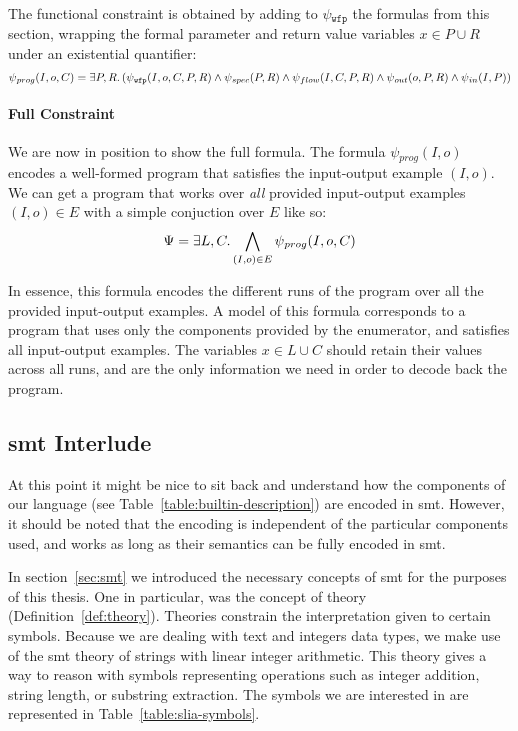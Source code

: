 The functional constraint is obtained by adding to $\psi{}_{\mathtt{wfp}}$ the
formulas from this section, wrapping the formal parameter and return value
variables $x \in P \cup R$ under an existential quantifier:
%
\[
  \psi{}_{prog}(I, o, C) = \exists P,R\ldotp
  (\psi{}_{\mathtt{wfp}}(I, o, C, P, R) \wedge
  \psi{}_{spec}(P, R) \wedge
  \psi{}_{flow}(I, C, P, R) \wedge 
  \psi{}_{out}(o, P, R) \wedge
  \psi{}_{in}(I, P))
\]

\paragraph{Full Constraint}
\label{sec:full-constraint}

We are now in position to show the full formula. The formula $\psi{}_{prog}(I,
o)$ encodes a well-formed program that satisfies the input-output example $(I,
o)$. We can get a program that works over \textit{all} provided
input-output examples $(I, o) \in E$ with a simple conjuction over $E$ like so:
%
\[
  \Psi{} = \exists L,C\ldotp \bigwedge_{(I, o) \in E}\psi{}_{prog}(I, o, C)
\]

\noindent
In essence, this formula encodes the different runs of the program over all
the provided input-output examples. A model of this formula corresponds to a
program that uses only the components provided by the enumerator, and satisfies
all input-output examples. The variables $x \in L \cup C$ should retain their
values across all runs, and are the only information we need in order to decode
back the program.

\subsection{\gls{smt} Interlude}
\label{sec:smt-interlude}

At this point it might be nice to sit back and understand how the components of
our language (see Table~\ref{table:builtin-description}) are encoded in
\gls{smt}.
However, it should be noted that the encoding is independent of the particular
components used, and works as long as their semantics can be fully encoded in
\gls{smt}.

In section~\ref{sec:smt} we introduced the necessary concepts of \gls{smt} for
the purposes of this thesis.
One in particular, was the concept of theory (Definition~\ref{def:theory}).
Theories constrain the interpretation given to certain symbols.
Because we are dealing with text and integers data types, we make use of the
\gls{smt} theory of strings with linear integer arithmetic.
This theory gives a way to reason with symbols representing operations such as
integer addition, string length, or substring extraction.
The symbols we are interested in are represented in
Table~\ref{table:slia-symbols}.

